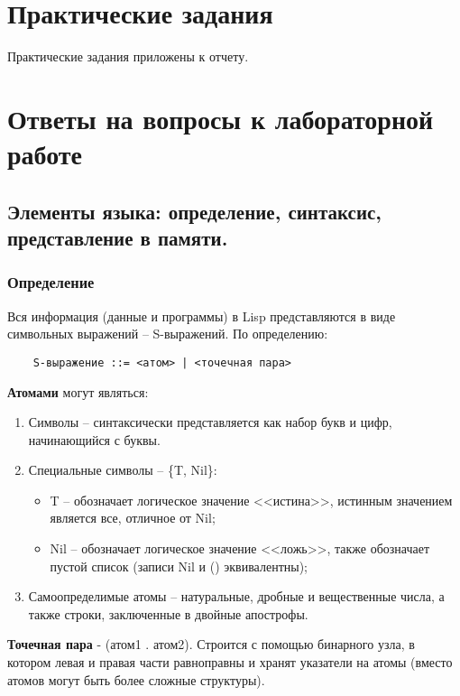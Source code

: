 \chapter{Практические задания}

Практические задания приложены к отчету.

\chapter{Ответы на вопросы к лабораторной работе}

\section{Элементы языка: определение, синтаксис, представление в памяти.}

\subsection{Определение}

Вся информация (данные и программы) в Lisp представляются в виде символьных выражений -- S-выражений. По определению:

\begin{lstlisting}
	S-выражение ::= <атом> | <точечная пара> 
\end{lstlisting}

\textbf{Атомами} могут являться:
\begin{enumerate}
	\item Символы -- синтаксически представляется как набор букв и цифр, начинающийся с буквы.
	\item Специальные символы -- \{T, Nil\}:
	\begin{itemize}
		\item T -- обозначает логическое значение <<истина>>, истинным значением является все, отличное от Nil;
		\item Nil -- обозначает логическое значение <<ложь>>, также обозначает пустой список (записи Nil и () эквивалентны);
	\end{itemize}
	\item Самоопределимые атомы -- натуральные, дробные и вещественные числа, а также строки, заключенные в двойные апострофы.
\end{enumerate}


\textbf{Точечная пара} - (атом1 . атом2). Строится с помощью бинарного узла, в котором левая и правая части равноправны и хранят указатели на атомы (вместо атомов могут быть более сложные структуры).   

